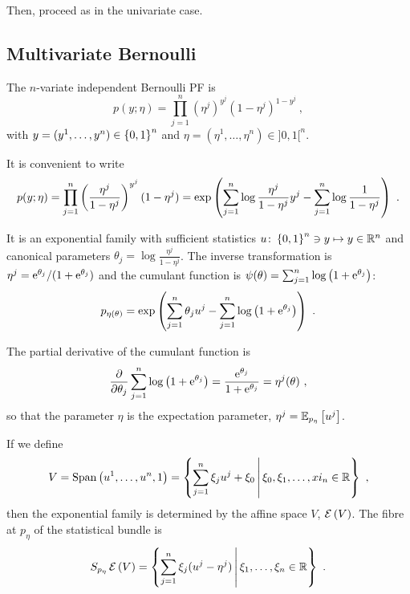 \documentclass[12pt,a4paper]{amsart}
\theoremstyle{remark}
\begin{document}
Then, proceed as in the univariate case.

\subsection{Multivariate Bernoulli}
\label{sec:mult-binom}

The $n$-variate independent Bernoulli PF is 
\begin{equation}
    p(y;\eta) = \prod_{j=1}^n (\eta^j)^{y^j}(1-\eta^j)^{1-y^j} \ , 
\end{equation}
with $y = (y^1,\dots,y^n) \in \left\{0,1\right\}^n$ and $\eta = (\eta^1,\dots,\eta^n) \in ]0,1[^n$.

It is convenient to write
\begin{equation}
  \label{eq:exponential-family}
    p(y;\eta) = \prod_{j=1}^n \left(\frac{\eta^j}{1-\eta^j}\right)^{y^j} (1 - \eta^j) = \exp\left(\sum_{j=1}^n \log \frac{\eta^j}{1-\eta^j} y^j - \sum_{j=1}^n \log \frac 1 {1 - \eta^j}\right) \ .
  \end{equation}

  It is an exponential family with sufficient statistics $u \colon \left\{0,1\right\}^n \ni y \mapsto y \in \mathbb{R}^n$ and canonical parameters $\theta_j = \log \frac{\eta^j}{1-\eta^j}$. The inverse transformation is $\eta^j = \mathrm{e}^{\theta_j}/(1+\mathrm{e}^{\theta_j})$ and the cumulant function is $\psi(\theta) = \sum_{j=1}^n \log \left(1 + \mathrm{e}^{\theta_j}\right)$:
      \begin{equation}
        \label{eq:21}
        p_{\eta(\theta)} = \exp\left(\sum_{j=1}^n \theta_j u^j - \sum_{j=1}^n \log \left(1 + \mathrm{e}^{\theta_j}\right)\right) \ .
      \end{equation}

 The partial derivative of the cumulant function is
      \begin{equation}
        \label{eq:26}
        \frac {\partial} {\partial \theta_j} \sum_{j=1}^n \log \left(1 + \mathrm{e}^{\theta_j}\right) = \frac{\mathrm{e}^{\theta_j}}{1 + \mathrm{e}^{\theta_j}} = \eta^j(\theta) \ , \end{equation}
      so that the parameter $\eta$ is the expectation parameter, $\eta^j = \operatorname{\mathbb E}_{p_\eta}\left[u^j\right]$.

If we define
\begin{equation}
  \label{eq:27}
  V = \operatorname{Span}\left(u^1,\dots,u^n,1\right) = \left\{\sum_{j=1}^n \xi_j u^j + \xi_0 \, \middle| \, \xi_0,\xi_1, \dots,xi_n \in \mathbb{R} \right\} \ ,
\end{equation}
then the exponential family is determined by the affine space $V$, $\operatorname{\mathcal E}\left(V\right)$. The fibre at $p_\eta$ of the statistical bundle is
\begin{equation}
  \label{eq:28}
  S_{p_\eta}\operatorname{\mathcal E}\left(V\right) = \left\{\sum_{j=1}^n \xi_j(u^j - \eta^j) \, \middle| \, \xi_1,\dots,\xi_n \in \mathbb{R} \right\} \ .
\end{equation}
\end{document}

